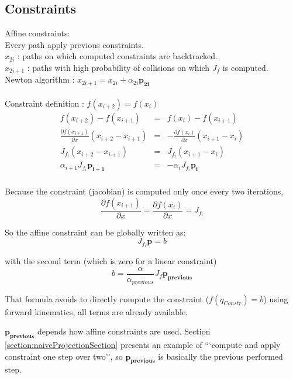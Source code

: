 \documentclass {article}
\newcommand\p{\mathbf{p_i}}
\newcommand\Jfi{J_{f_i}}
\begin{document}
\subsection{Constraints}
Affine constraints: \\
Every path apply previous constraints. \\
$x_{2i}$ : paths on which computed constraints are backtracked. \\
$x_{2i+1}$ : paths with high probability of collisions on which $J_f$ is 
computed. \\
Newton algorithm : $ x_{2i+1} = x_{2i} + \alpha_{2i} \mathbf{p_{2i}} $ \\
\\
Constraint definition : $ f(x_{i+2}) = f(x_{i}) $ \\
\begin{eqnarray}
f(x_{i+2}) - f(x_{i+1}) &=& f(x_i) - f(x_{i+1}) \\
\frac{\partial{f(x_{i+1})}}{\partial{x}}(x_{i+2}-x_{i+1}) &=& 
-\frac{\partial{f(x_{i})}}{\partial{x}}(x_{i+1}-x_{i})\\
\Jfi(x_{i+2}-x_{i+1}) &=& \Jfi(x_{i+1}-x_i) \\
\alpha_{i+1} \Jfi \mathbf{p_{i+1}} &=& - \alpha_i \Jfi  \p \ \ \  \\
\end{eqnarray}

Because the constraint (jacobian) is computed only once every two iterations, 
$$\frac{\partial{f(x_{i+1})}}{\partial{x}} = \frac{\partial{f(x_{i})}}
{\partial{x}} = \Jfi$$

So the affine constraint can be globally written as:
$$ \Jfi \mathbf{p} = b $$

with the second term (which is zero for a linear constraint)
$$ b = \frac{\alpha}{\alpha_{previous}} J_{f} \mathbf{p_{previous}}$$

That formula avoids to directly compute the constraint ($f(q_{Constr}) = b$) 
using forward kinematics, all terms are already available.

$ \mathbf{p_{previous}} $ depends how affine constraints are used. Section 
\ref{section:naiveProjectionSection} presents an example of ```compute and apply 
constraint one step over two'', so $ \mathbf{p_{previous}} $ is basically the 
previous performed step.
\end{document}
